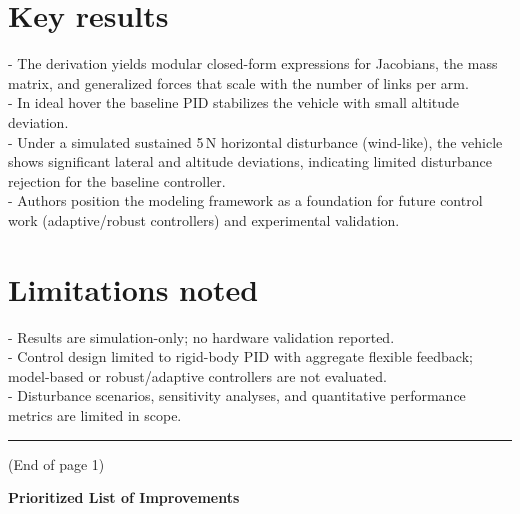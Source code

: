 \documentclass[11pt,letterpaper]{article}
\begin{document}
\section*{Key results}
- The derivation yields modular closed-form expressions for Jacobians, the mass matrix, and generalized forces that scale with the number of links per arm.\\
- In ideal hover the baseline PID stabilizes the vehicle with small altitude deviation.\\
- Under a simulated sustained 5\,N horizontal disturbance (wind-like), the vehicle shows significant lateral and altitude deviations, indicating limited disturbance rejection for the baseline controller.\\
- Authors position the modeling framework as a foundation for future
control work (adaptive/robust controllers) and experimental
validation.

\section*{Limitations noted}
- Results are simulation-only; no hardware validation reported.\\
- Control design limited to rigid-body PID with aggregate flexible feedback; model-based or robust/adaptive controllers are not evaluated.\\
- Disturbance scenarios, sensitivity analyses, and quantitative
performance metrics are limited in scope.

\vfill
\hrule
\bigskip
\noindent (End of page 1)

\newpage

\begin{center}
  {\Large\bfseries Prioritized List of Improvements}
\end{center}

\vspace{6pt}
\end{document}
